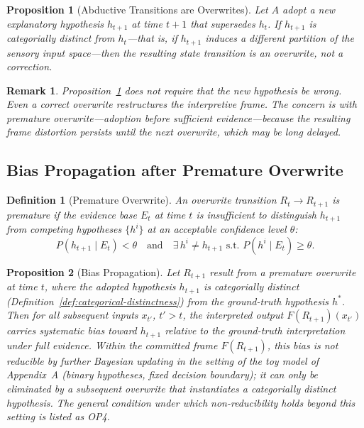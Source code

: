\documentclass[12pt]{article}
\newtheorem{definition}{Definition}
\newtheorem{proposition}{Proposition}
\newtheorem{remark}{Remark}
\begin{document}
\begin{proposition}[Abductive Transitions are Overwrites]
\label{prop:overwrite}
Let $A$ adopt a new explanatory hypothesis $h_{t+1}$ at time $t+1$
that supersedes $h_t$.
If $h_{t+1}$ is categorially distinct from $h_t$---that is, if $h_{t+1}$
induces a different partition of the sensory input space---then the
resulting state transition is an overwrite, not a correction.
\end{proposition}

\begin{remark}
Proposition~\ref{prop:overwrite} does not require that the new hypothesis
be wrong. Even a correct overwrite restructures the interpretive frame.
The concern is with \emph{premature} overwrite---adoption before
sufficient evidence---because the resulting frame distortion persists
until the next overwrite, which may be long delayed.
\end{remark}

\subsection{Bias Propagation after Premature Overwrite}

\begin{definition}[Premature Overwrite]
An overwrite transition $R_t \to R_{t+1}$ is premature if the evidence
base $E_t$ at time $t$ is insufficient to distinguish $h_{t+1}$ from
competing hypotheses $\{h^i\}$ at an acceptable confidence level
$\theta$:
\[
P(h_{t+1} \mid E_t) < \theta \quad \text{and} \quad
\exists\, h^i \neq h_{t+1} \text{ s.t. } P(h^i \mid E_t) \geq \theta.
\]
\end{definition}

\begin{proposition}[Bias Propagation]
\label{prop:bias}
Let $R_{t+1}$ result from a premature overwrite at time $t$, where the
adopted hypothesis $h_{t+1}$ is categorially distinct
(Definition~\ref{def:categorical-distinctness}) from the ground-truth
hypothesis $h^*$.
Then for all subsequent inputs $x_{t'}$, $t' > t$, the interpreted
output $F(R_{t+1})(x_{t'})$ carries systematic bias toward $h_{t+1}$
relative to the ground-truth interpretation under full evidence.
Within the committed frame $F(R_{t+1})$, this bias is not reducible
by further Bayesian updating in the setting of the toy model of
Appendix~A (binary hypotheses, fixed decision boundary); it can only
be eliminated by a subsequent overwrite that instantiates a
categorially distinct hypothesis. The general condition under which
non-reducibility holds beyond this setting is listed as OP4.
\end{proposition}
\end{document}
